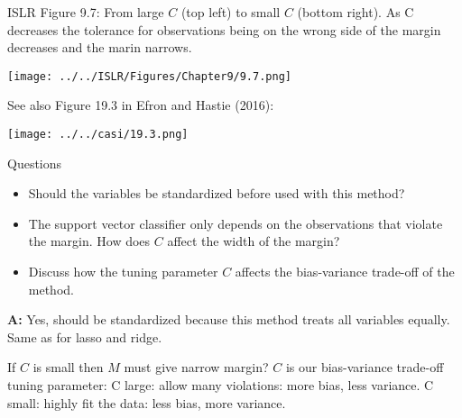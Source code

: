 \documentclass[10pt,ignorenonframetext,]{beamer}
\providecommand{\tightlist}{%
  \setlength{\itemsep}{0pt}\setlength{\parskip}{0pt}}
\begin{document}
\begin{frame}

ISLR Figure 9.7: From large \(C\) (top left) to small \(C\) (bottom
right). As C decreases the tolerance for observations being on the wrong
side of the margin decreases and the marin narrows.

\centering
\texttt{[image: ../../ISLR/Figures/Chapter9/9.7.png]}

\end{frame}

\begin{frame}

See also Figure 19.3 in Efron and Hastie (2016):

\centering
\texttt{[image: ../../casi/19.3.png]}

\end{frame}

\begin{frame}

\begin{block}{Questions}

\begin{itemize}
\tightlist
\item
  Should the variables be standardized before used with this method?
\item
  The support vector classifier only depends on the observations that
  violate the margin. How does \(C\) affect the width of the margin?\\
\item
  Discuss how the tuning parameter \(C\) affects the bias-variance
  trade-off of the method.
\end{itemize}

\end{block}

\end{frame}

\begin{frame}

\textbf{A:} Yes, should be standardized because this method treats all
variables equally. Same as for lasso and ridge.

If \(C\) is small then \(M\) must give narrow margin? \(C\) is our
bias-variance trade-off tuning parameter: C large: allow many
violations: more bias, less variance. C small: highly fit the data: less
bias, more variance.

\end{frame}
\end{document}
